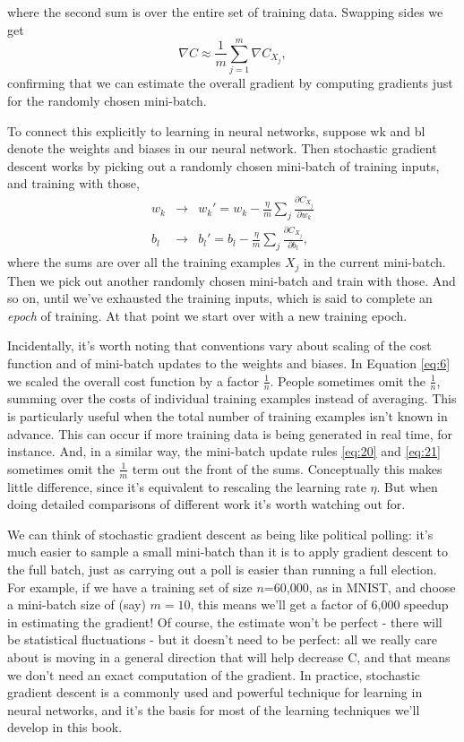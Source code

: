 \documentclass[a4paper,twoside,10pt]{book}
\begin{document}
where the second sum is over the entire set of training data. Swapping sides we get
\begin{equation}
\nabla C \approx \frac{1}{m} \sum_{j=1}^m \nabla C_{X_{j}},
	\label{eq:19}
\end{equation}
confirming that we can estimate the overall gradient by computing gradients just for the randomly chosen mini-batch.

To connect this explicitly to learning in neural networks, suppose wk and bl denote the weights and biases in our neural network. Then stochastic gradient descent works by picking out a randomly chosen mini-batch of training inputs, and training with those,
\begin{eqnarray} 
w_k & \rightarrow & w_k' = w_k-\frac{\eta}{m} \sum_j \frac{\partial C_{X_j}}{\partial w_k}\label{eq:20}\\
b_l & \rightarrow & b_l' = b_l-\frac{\eta}{m} \sum_j \frac{\partial C_{X_j}}{\partial b_l}\label{eq:21},
\end{eqnarray}
where the sums are over all the training examples $X_j$ in the current mini-batch. Then we pick out another randomly chosen mini-batch and train with those. And so on, until we've exhausted the training inputs, which is said to complete an \textit{epoch} of training. At that point we start over with a new training epoch.

Incidentally, it's worth noting that conventions vary about scaling of the cost function and of mini-batch updates to the weights and biases. In Equation \ref{eq:6} we scaled the overall cost function by a factor $\frac1n$. People sometimes omit the $\frac1n$, summing over the costs of individual training examples instead of averaging. This is particularly useful when the total number of training examples isn't known in advance. This can occur if more training data is being generated in real time, for instance. And, in a similar way, the mini-batch update rules \ref{eq:20} and \ref{eq:21} sometimes omit the $\frac1m$ term out the front of the sums. Conceptually this makes little difference, since it's equivalent to rescaling the learning rate $\eta$. But when doing detailed comparisons of different work it's worth watching out for.

We can think of stochastic gradient descent as being like political polling: it's much easier to sample a small mini-batch than it is to apply gradient descent to the full batch, just as carrying out a poll is easier than running a full election. For example, if we have a training set of size $n$=60,000, as in MNIST, and choose a mini-batch size of (say) $m=10$, this means we'll get a factor of 6,000 speedup in estimating the gradient! Of course, the estimate won't be perfect - there will be statistical fluctuations - but it doesn't need to be perfect: all we really care about is moving in a general direction that will help decrease C, and that means we don't need an exact computation of the gradient. In practice, stochastic gradient descent is a commonly used and powerful technique for learning in neural networks, and it's the basis for most of the learning techniques we'll develop in this book.
\end{document}
